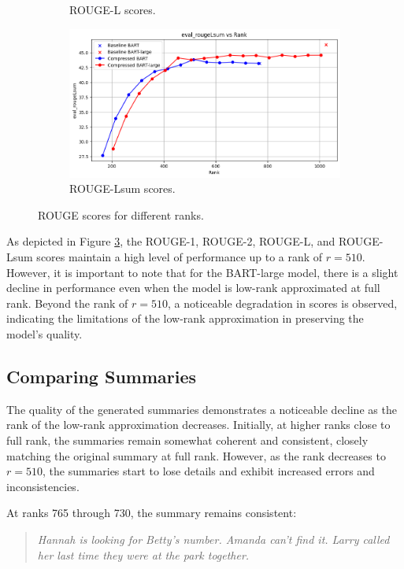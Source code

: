 \begin{figure}[H]
\begin{subfigure}[b]{0.45\textwidth}
        \caption{ROUGE-L scores.}
        \label{fig:sub3}
    \end{subfigure}
    \hfill
    \begin{subfigure}[b]{0.45\textwidth}
        \centering
        \includegraphics[width=\textwidth]{figs/06:05/RougeLSum.png}
        \caption{ROUGE-Lsum scores.}
        \label{fig:sub4}
    \end{subfigure}
    \caption{ROUGE scores for different ranks.}
    \label{fig:main}
\end{figure}

As depicted in Figure \ref{fig:main}, the ROUGE-1, ROUGE-2, ROUGE-L, and ROUGE-Lsum scores maintain a high level of performance up to a rank of \(r = 510\). However, it is important to note that for the BART-large model, there is a slight decline in performance even when the model is low-rank approximated at full rank. Beyond the rank of \(r = 510\), a noticeable degradation in scores is observed, indicating the limitations of the low-rank approximation in preserving the model's quality.

\subsection{Comparing Summaries}

The quality of the generated summaries demonstrates a noticeable decline as the rank of the low-rank approximation decreases. Initially, at higher ranks close to full rank, the summaries remain somewhat coherent and consistent, closely matching the original summary at full rank. However, as the rank decreases to \(r = 510\), the summaries start to lose details and exhibit increased errors and inconsistencies.

At ranks 765 through 730, the summary remains consistent:
\begin{quote}
    \textit{Hannah is looking for Betty's number. Amanda can't find it. Larry called her last time they were at the park together.}
\end{quote}

